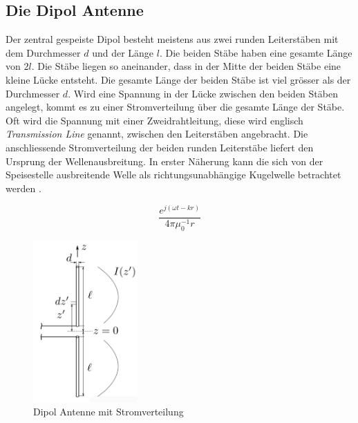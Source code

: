 

\newpage
\subsection{Die Dipol Antenne}\label{sec:DipolAntenne}
Der zentral gespeiste Dipol besteht meistens aus zwei runden Leiterstäben mit dem Durchmesser $d$ und der Länge $l$. Die beiden Stäbe haben eine gesamte Länge von $2l$. Die  Stäbe liegen so aneinander, dass in der Mitte der beiden Stäbe eine kleine Lücke entsteht. Die gesamte Länge der beiden Stäbe ist viel grösser als  der Durchmesser $d$. Wird eine Spannung  in der Lücke zwischen den beiden Stäben angelegt, kommt es zu einer Stromverteilung über die gesamte Länge der  Stäbe. Oft wird die Spannung mit einer Zweidrahtleitung,  diese wird englisch \textit{Transmission Line} genannt, zwischen den Leiterstäben angebracht. Die anschliessende Stromverteilung der beiden runden Leiterstäbe liefert den Ursprung der Wellenausbreitung. In erster Näherung kann die sich von der Speisestelle ausbreitende Welle als richtungsunabhängige Kugelwelle betrachtet werden \cite{elliott1981antenna}.

\begin{equation}\label{term:Kugelwelle}
\frac{e^{j(\omega t-kr)}}{4\pi \mu_{0}^{-1}r}
\end{equation}

\begin{figure}[!h]
	\centering
	\includegraphics[width=4cm]{content/bilder/Dipol_EMANT_S42.pdf}%
	\caption{Dipol Antenne mit Stromverteilung \cite{Tekom}}
	\label{FitzDipol}
\end{figure}

